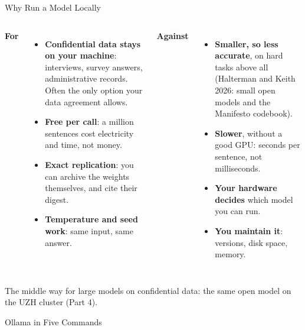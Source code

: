 

\begin{frame}{Why Run a Model Locally}

\small
\begin{columns}[T]
\textbf{For}
\begin{itemize}
    \setlength{\itemsep}{4pt}
    \item \textbf{Confidential data stays on your machine}: interviews, survey answers, administrative records. Often the only option your data agreement allows.
    \item \textbf{Free per call}: a million sentences cost electricity and time, not money.
    \item \textbf{Exact replication}: you can archive the weights themselves, and cite their digest.
    \item \textbf{Temperature and seed work}: same input, same answer.
\end{itemize}

\textbf{Against}
\begin{itemize}
    \setlength{\itemsep}{4pt}
    \item \textbf{Smaller, so less accurate}, on hard tasks above all (Halterman and Keith 2026: small open models and the Manifesto codebook).
    \item \textbf{Slower}, without a good GPU: seconds per sentence, not milliseconds.
    \item \textbf{Your hardware decides} which model you can run.
    \item \textbf{You maintain it}: versions, disk space, memory.
\end{itemize}
\end{columns}

\vspace{0.4cm}
\centering
{\small The middle way for large models on confidential data: the same open model on the UZH cluster (Part 4).}

\end{frame}

\begin{frame}[fragile]{Ollama in Five Commands}

\small

\end{frame}

